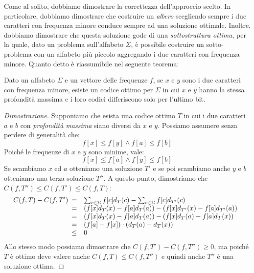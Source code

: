 \bigskip\noindent
Come al solito, dobbiamo dimostrare la correttezza dell'approccio scelto. In
particolare, dobbiamo dimostrare che costruire un \emph{albero} scegliendo
sempre i due caratteri con frequenza minore conduce sempre ad una soluzione
ottimale. Inoltre, dobbiamo dimostrare che questa soluzione gode di una
\emph{sottostruttura ottima}, per la quale, dato un problema sull'alfabeto
$\Sigma$, è possibile costruire un sotto-problema con un alfabeto più piccolo
aggregando i due caratteri con frequenza minore. Quanto detto è riassumibile
nel seguente teorema:
\begin{definition}
    Dato un alfabeto $\Sigma$ e un vettore delle frequenze $f$, se $x$ e $y$
    sono i due caratteri con frequenza minore, esiste un codice ottimo per
    $\Sigma$ in cui $x$ e $y$ hanno la stessa profondità massima e i loro codici
    differiscono solo per l'ultimo bit.
\end{definition}
\begin{proof}[Dimostrazione]
    Supponiamo che esista una codice ottimo $T$ in cui i due caratteri $a$ e $b$
    con \emph{profondità massima} siano diversi da $x$ e $y$. Possiamo assumere
    senza perdere di generalità che:
    \[f[x]\leq f[y]\wedge f[a]\leq f[b]\]
    Poiché le frequenze di $x$ e $y$ sono minime, vale:
    \[f[x]\leq f[a]\wedge f[y]\leq f[b]\]
    Se scambiamo $x$ ed $a$ otteniamo una soluzione $T'$ e se poi scambiamo
    anche $y$ e $b$ otteniamo una terza soluzione $T''$. A questo punto,
    dimostriamo che $C(f,T'')\leq C(f,T')\leq C(f,T)$:
    \[C(f,T)-C(f,T')\begin{array}[t]{cl}
        = & \sum_{c\in\Sigma} f[c]d_T(c)-\sum_{c\in\Sigma}f[c]d_{T'}(c)\\
        = & \left(f[x]d_T(x)-f[a]d_{T}(a)\right)-\left(f[x]d_{T'}(x)-
        f[a]d_{T'}(a)\right)\\
        = & \left(f[x]d_T(x)-f[a]d_{T}(a)\right)-\left(f[x]d_{T}(a)-
        f[a]d_{T}(x)\right)\\
        = & \left(f[a]-f[x]\right)\cdot\left(d_T(a)-d_T(x)\right)\\
        \leq & 0
    \end{array}\]
    Allo stesso modo possiamo dimostrare che $C(f,T')-C(f,T'')\geq 0$, ma
    poiché $T$ è ottimo deve valere anche $C(f,T)\leq C(f,T'')$ e quindi anche
    $T''$ è una soluzione ottima.
\end{proof}

